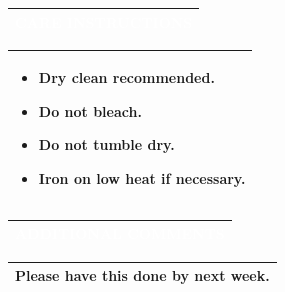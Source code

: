 \documentclass[landscape]{article}
\newcommand{\techsection}[1]{%
\noindent\begin{tabularx}{\textwidth}{|X|}
\hline
\cellcolor{primaryblue}\textcolor{white}{\large\textbf{#1}} \\
\hline
\end{tabularx}
\vspace{0.1cm}
}
\begin{document}
\vspace{0.7cm}

\newpage

\techsection{CARE INSTRUCTIONS}
\vspace{-0.3cm}

\noindent\begin{tabularx}{\textwidth}{|X|}
\hline
\begin{minipage}[t]{\linewidth}
\vspace{0.3cm}
\large
\begin{itemize}
  \item Dry clean recommended.
  \item Do not bleach.
  \item Do not tumble dry.
  \item Iron on low heat if necessary.
\end{itemize}
\vspace{0.3cm}
\end{minipage} \\
\hline
\end{tabularx}

\vspace{0.7cm}

\newpage

\techsection{ADDITIONAL COMMENTS}
\vspace{-0.3cm}
\noindent\begin{tabularx}{\textwidth}{|X|}
\hline
\large Please have this done by next week. \\
\hline
\end{tabularx}
\end{document}
